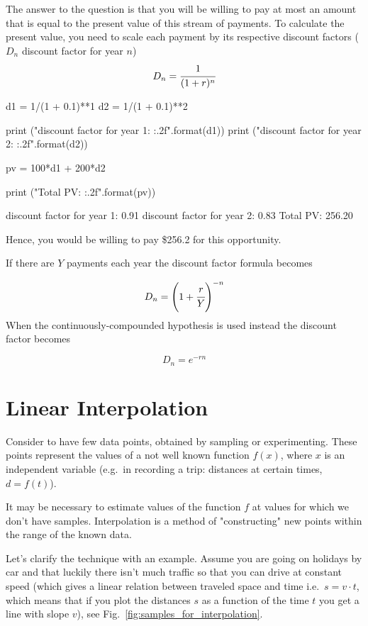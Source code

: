 The answer to the question is that you will be willing to pay at most an amount that is equal to the present value of this stream of payments. To calculate the present value, you need to scale each payment by its respective discount factors ($D_n$ discount factor for year $n$)
\begin{equation}
	D_n = \cfrac{1}{(1 + r)^n}
\end{equation}

\begin{ipython}
d1 = 1/(1 + 0.1)**1
d2 = 1/(1 + 0.1)**2

print ("discount factor for year 1: {:.2f}".format(d1))
print ("discount factor for year 2: {:.2f}".format(d2))

pv = 100*d1 + 200*d2

print ("Total PV: {:.2f}".format(pv))
\end{ipython}
\begin{ioutput}
discount factor for year 1: 0.91
discount factor for year 2: 0.83
Total PV: 256.20
\end{ioutput}
\noindent
Hence, you would be willing to pay \$256.2 for this opportunity.

If there are $Y$ payments each year the discount factor formula becomes

\begin{equation}
D_n = \left(1+\cfrac{r}{Y}\right)^{-n}
\end{equation}
\noindent
When the continuously-compounded hypothesis is used instead the discount factor becomes

\begin{equation}
D_n = e^{-rn}
\end{equation}

\section{Linear Interpolation}
\label{linear-interpolation}

Consider to have few data points, obtained by sampling or experimenting. These points represent the values of a not well known function \(f(x)\), where \(x\) is an independent variable (e.g.~in recording a trip: distances at certain times, \(d = f(t)\)).

It may be necessary to estimate values of the function $f$ at values for which we don't have samples. Interpolation is a method of "constructing" new points within the range of the known data.

Let's clarify the technique with an example.
Assume you are going on holidays by car and that luckily there isn't much traffic so that you can drive at constant speed (which gives a linear relation between traveled space and time i.e.~\(s = v \cdot t\), which means that if you plot the distances \(s\) as a function of the time \(t\) you get a line with slope \(v\)), see Fig.~\ref{fig:samples_for_interpolation}.

